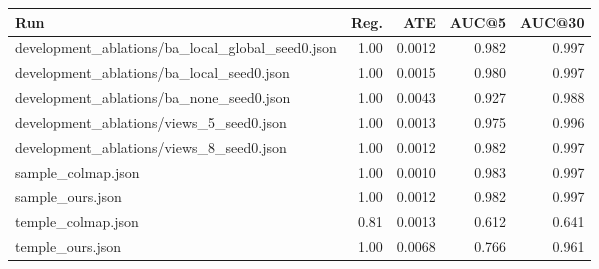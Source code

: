 \begin{tabular}{lrrrr}
\hline
Run & Reg. & ATE & AUC@5 & AUC@30 \\
\hline
development\_ablations/ba\_local\_global\_seed0.json & 1.00 & 0.0012 & 0.982 & 0.997 \\
development\_ablations/ba\_local\_seed0.json & 1.00 & 0.0015 & 0.980 & 0.997 \\
development\_ablations/ba\_none\_seed0.json & 1.00 & 0.0043 & 0.927 & 0.988 \\
development\_ablations/views\_5\_seed0.json & 1.00 & 0.0013 & 0.975 & 0.996 \\
development\_ablations/views\_8\_seed0.json & 1.00 & 0.0012 & 0.982 & 0.997 \\
sample\_colmap.json & 1.00 & 0.0010 & 0.983 & 0.997 \\
sample\_ours.json & 1.00 & 0.0012 & 0.982 & 0.997 \\
temple\_colmap.json & 0.81 & 0.0013 & 0.612 & 0.641 \\
temple\_ours.json & 1.00 & 0.0068 & 0.766 & 0.961 \\
\hline
\end{tabular}
